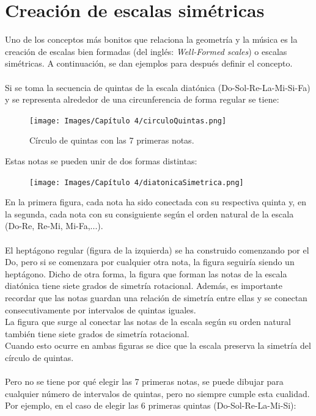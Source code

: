 \documentclass[a4paper, openright, 11pt, titlepage]{report}
\theoremstyle{definition}\newtheorem{defin}[propo]{Definition}
\theoremstyle{definition}\newtheorem{obser}[propo]{Remark}
\theoremstyle{definition}\newtheorem{ejem}[propo]{Ejemplo}
\theoremstyle{definition}\newtheorem{algoritmo}[propo]{Algoritmo}
\begin{document}
\section{Creación de escalas simétricas}
Uno de los conceptos más bonitos que relaciona la geometría y la música es la creación de escalas bien formadas (del inglés: \textit{Well-Formed scales}) o escalas simétricas. A continuación, se dan ejemplos para después definir el concepto.\\\\
Si se toma la secuencia de quintas de la escala diatónica (Do-Sol-Re-La-Mi-Si-Fa) y se representa alrededor de una circunferencia de forma regular se tiene: 
\begin{figure}[H]
    \centering
    \texttt{[image: Images/Capítulo 4/circuloQuintas.png]}
    \caption{Círculo de quintas con las 7 primeras notas.}
\end{figure}
Estas notas se pueden unir de dos formas distintas:
\begin{figure}[H]
    \centering
    \texttt{[image: Images/Capítulo 4/diatonicaSimetrica.png]}
\end{figure}
En la primera figura, cada nota ha sido conectada con su respectiva quinta y, en la segunda, cada nota con su consiguiente según el orden natural de la escala (Do-Re, Re-Mi, Mi-Fa,...).\\\\
El heptágono regular (figura de la izquierda) se ha construido comenzando por el Do, pero si se comenzara por cualquier otra nota, la figura seguiría siendo un heptágono. Dicho de otra forma, la figura que forman las notas de la escala diatónica tiene siete grados de simetría rotacional. Además, es importante recordar que las notas guardan una relación de simetría entre ellas y se conectan consecutivamente por intervalos de quintas iguales.\\
La figura que surge al conectar las notas de la escala según su orden natural también tiene siete grados de simetría rotacional.\\
Cuando esto ocurre en ambas figuras se dice que la escala preserva la simetría del círculo de quintas.\\\\
Pero no se tiene por qué elegir las 7 primeras notas, se puede dibujar para cualquier número de intervalos de quintas, pero no siempre cumple esta cualidad. Por ejemplo, en el caso de elegir las 6 primeras quintas (Do-Sol-Re-La-Mi-Si):
\end{document}
